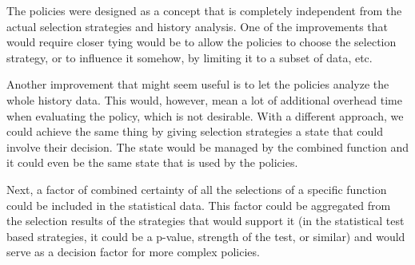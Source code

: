 The policies were designed as a concept that is completely independent from the actual selection strategies and history analysis. One of the improvements that would require closer tying would be to allow the policies to choose the selection strategy, or to influence it somehow, by limiting it to a subset of data, etc. 

Another improvement that might seem useful is to let the policies analyze the whole history data. This would, however, mean a lot of additional overhead time when evaluating the policy, which is not desirable.
With a different approach, we could achieve the same thing by giving selection strategies a state that could involve their decision. The state would be managed by the combined function and it could even be the same state that is used by the policies. 

Next, a factor of combined certainty of all the selections of a specific function could be included in the statistical data. This factor could be aggregated from the selection results of the strategies that would support it (in the statistical test based strategies, it could be a p-value, strength of the test, or similar) and would serve as a decision factor for more complex policies.
